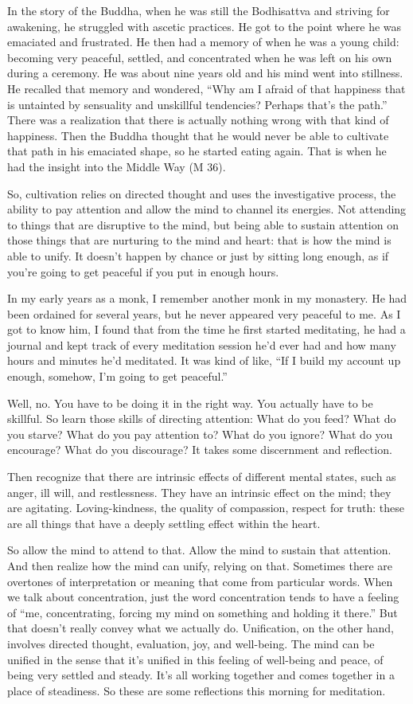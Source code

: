 In the story of the Buddha, when he was still the Bodhisattva and
striving for awakening, he struggled with ascetic practices. He got to
the point where he was emaciated and frustrated. He then had a memory of
when he was a young child: becoming very peaceful, settled, and
concentrated when he was left on his own during a ceremony. He was about
nine years old and his mind went into stillness. He recalled that memory
and wondered, “Why am I afraid of that happiness that is untainted by
sensuality and unskillful tendencies? Perhaps that’s the path.” There
was a realization that there is actually nothing wrong with that kind of
happiness. Then the Buddha thought that he would never be able to
cultivate that path in his emaciated shape, so he started eating again.
That is when he had the insight into the Middle Way (M 36).

So, cultivation relies on directed thought and uses the investigative
process, the ability to pay attention and allow the mind to channel its
energies. Not attending to things that are disruptive to the mind, but
being able to sustain attention on those things that are nurturing to
the mind and heart: that is how the mind is able to unify. It doesn’t
happen by chance or just by sitting long enough, as if you’re going to
get peaceful if you put in enough hours.

In my early years as a monk, I remember another monk in my monastery. He
had been ordained for several years, but he never appeared very peaceful
to me. As I got to know him, I found that from the time he first started
meditating, he had a journal and kept track of every meditation session
he’d ever had and how many hours and minutes he’d meditated. It was kind
of like, “If I build my account up enough, somehow, I’m going to get
peaceful.”

Well, no. You have to be doing it in the right way. You actually have to
be skillful. So learn those skills of directing attention: What do you
feed? What do you starve? What do you pay attention to? What do you
ignore? What do you encourage? What do you discourage? It takes some
discernment and reflection.

Then recognize that there are intrinsic effects of different mental
states, such as anger, ill will, and restlessness. They have an
intrinsic effect on the mind; they are agitating. Loving-kindness, the
quality of compassion, respect for truth: these are all things that have
a deeply settling effect within the heart.

So allow the mind to attend to that. Allow the mind to sustain that
attention. And then realize how the mind can unify, relying on that.
Sometimes there are overtones of interpretation or meaning that come
from particular words. When we talk about concentration, just the word
concentration tends to have a feeling of “me, concentrating, forcing my
mind on something and holding it there.” But that doesn’t really convey
what we actually do. Unification, on the other hand, involves directed
thought, evaluation, joy, and well-being. The mind can be unified in the
sense that it’s unified in this feeling of well-being and peace, of
being very settled and steady. It’s all working together and comes
together in a place of steadiness. So these are some reflections this
morning for meditation.
